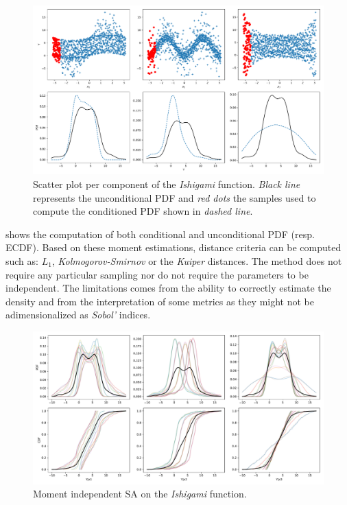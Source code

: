 \begin{figure}[!ht]
\centering
\includegraphics[width=\linewidth,keepaspectratio]{fig/literature/scatter_moments.pdf}
\caption{Scatter plot per component of the \textit{Ishigami} function. \emph{Black line} represents the unconditional PDF and \emph{red dots} the samples used to compute the conditioned PDF shown in \emph{dashed line}.}
\label{fig:scatter_moments}
\end{figure}

 shows the computation of both conditional and unconditional PDF (resp. ECDF). Based on these moment estimations, distance criteria can be computed such as: $L_1$, \emph{Kolmogorov-Smirnov} or the \emph{Kuiper} distances. The method does not require any particular sampling nor do not require the parameters to be independent. The limitations comes from the ability to correctly estimate the density and from the interpretation of some metrics as they might not be adimensionalized as \emph{Sobol'} indices.

\begin{figure}[!ht]
\centering
\includegraphics[width=\linewidth,keepaspectratio]{fig/literature/moment_independent-ishigami.pdf}
\caption{Moment independent SA on the \emph{Ishigami} function.}
\label{fig:moment_sa}
\end{figure}

